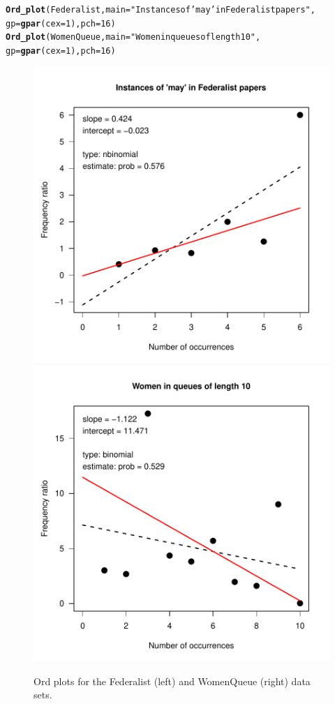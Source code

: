 \documentclass[11pt]{book}\usepackage[]{graphicx}\usepackage[]{color}
\makeatletter
\newcommand{\hlnum}[1]{\textcolor[rgb]{0.686,0.059,0.569}{#1}}%
\newcommand{\hlstr}[1]{\textcolor[rgb]{0.192,0.494,0.8}{#1}}%
\newcommand{\hlstd}[1]{\textcolor[rgb]{0.345,0.345,0.345}{#1}}%
\newcommand{\hlkwc}[1]{\textcolor[rgb]{0.333,0.667,0.333}{#1}}%
\newcommand{\hlkwd}[1]{\textcolor[rgb]{0.737,0.353,0.396}{\textbf{#1}}}%
\newenvironment{kframe}{%
 \def\at@end@of@kframe{}%
 \ifinner\ifhmode%
  \def\at@end@of@kframe{\end{minipage}}%
  \begin{minipage}{\columnwidth}%
 \fi\fi%
 \def\FrameCommand##1{\hskip\@totalleftmargin \hskip-\fboxsep
 \colorbox{shadecolor}{##1}\hskip-\fboxsep
     \hskip-\linewidth \hskip-\@totalleftmargin \hskip\columnwidth}%
 \MakeFramed {\advance\hsize-\width
   \@totalleftmargin\z@ \linewidth\hsize
   \@setminipage}}%
 {\par\unskip\endMakeFramed%
 \at@end@of@kframe}
\newenvironment{knitrout}{}{} %
\renewenvironment{knitrout}{\small\renewcommand{\baselinestretch}{.85}}{} %
\makeatother
\begin{document}
\begin{knitrout}
\color{fgcolor}\begin{kframe}
\begin{alltt}
\hlkwd{Ord_plot}\hlstd{(Federalist,} \hlkwc{main} \hlstd{=} \hlstr{"Instances of 'may' in Federalist papers"}\hlstd{,}
         \hlkwc{gp}\hlstd{=}\hlkwd{gpar}\hlstd{(}\hlkwc{cex}\hlstd{=}\hlnum{1}\hlstd{),} \hlkwc{pch}\hlstd{=}\hlnum{16}\hlstd{)}
\hlkwd{Ord_plot}\hlstd{(WomenQueue,} \hlkwc{main} \hlstd{=} \hlstr{"Women in queues of length 10"}\hlstd{,}
         \hlkwc{gp}\hlstd{=}\hlkwd{gpar}\hlstd{(}\hlkwc{cex}\hlstd{=}\hlnum{1}\hlstd{),} \hlkwc{pch}\hlstd{=}\hlnum{16}\hlstd{)}
\end{alltt}
\end{kframe}\begin{figure}[htbp]


\centerline{\includegraphics[width=.48\textwidth]{ch03/fig/ordplot31} 
\includegraphics[width=.48\textwidth]{ch03/fig/ordplot32} }

\caption[Ord plots for the Federalist (left) and WomenQueue (right) data sets]{Ord plots for the Federalist (left) and WomenQueue (right) data sets.\label{fig:ordplot3}}
\end{figure}


\end{knitrout}
\end{document}
